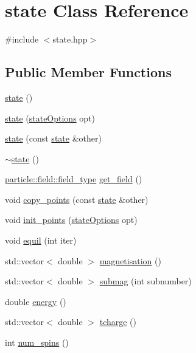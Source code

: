 \hypertarget{classstate}{}\section{state Class Reference}
\label{classstate}


{\ttfamily \#include $<$state.\+hpp$>$}

\subsection*{Public Member Functions}
\begin{DoxyCompactItemize}
\item 
\hyperlink{classstate_aee920d9f534640451f22b3525f9cb9de}{state} ()
\item 
\hyperlink{classstate_aa3dee783102d59b3c07617558c25afaf}{state} (\hyperlink{structstateOptions}{state\+Options} opt)
\item 
\hyperlink{classstate_a285d976cdbd4a9de9ec8d1d887991ecc}{state} (const \hyperlink{classstate}{state} \&other)
\item 
\hyperlink{classstate_a60216b51b01ca0ebe9786ec2da66568f}{$\sim$state} ()
\item 
\hyperlink{classparticle_1_1field_1_1field__type}{particle\+::field\+::field\+\_\+type} \hyperlink{classstate_a0a6f3f9510acca9b766cc4b4f17671c0}{get\+\_\+field} ()
\item 
void \hyperlink{classstate_a0d0ea6448509ececead44d83b4decd1c}{copy\+\_\+points} (const \hyperlink{classstate}{state} \&other)
\item 
void \hyperlink{classstate_aac3b2330539154d3784730e4c8a61123}{init\+\_\+points} (\hyperlink{structstateOptions}{state\+Options} opt)
\item 
void \hyperlink{classstate_af70b6f999313cc427a526388058cb45c}{equil} (int iter)
\item 
std\+::vector$<$ double $>$ \hyperlink{classstate_a5d5980e59b16063808f09eac46d14292}{magnetisation} ()
\item 
std\+::vector$<$ double $>$ \hyperlink{classstate_aff62d62706dc27dde2c3638769c0a00a}{submag} (int subnumber)
\item 
double \hyperlink{classstate_a6209503f752e5089e0301f103fdf1d1e}{energy} ()
\item 
std\+::vector$<$ double $>$ \hyperlink{classstate_aba4b4f47fc3b9cba97b5f63518214f30}{tcharge} ()
\item 
int \hyperlink{classstate_ad9182b875a7a3fb5981c811f7f062040}{num\+\_\+spins} ()
\item 

\end{DoxyCompactItemize}
